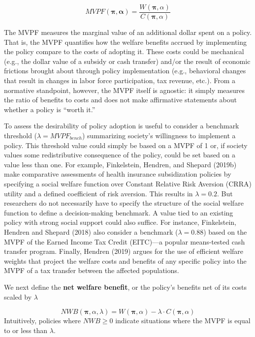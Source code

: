 \documentclass[
  10pt,
]{article}
\begin{document}
\[
MVPF(\boldsymbol{\boldsymbol{\pi},\alpha}) = \frac{W(\boldsymbol{\pi},\alpha)}{C(\boldsymbol{\pi},\alpha)}
\]

The MVPF measures the marginal value of an additional dollar spent on a
policy. That is, the MVPF quantifies how the welfare benefits accrued by
implementing the policy compare to the costs of adopting it. These costs
could be mechanical (e.g., the dollar value of a subsidy or cash
transfer) and/or the result of economic frictions brought about through
policy implementation (e.g., behavioral changes that result in changes
in labor force participation, tax revenue, etc.). From a normative
standpoint, however, the MVPF itself is agnostic: it simply measures the
ratio of benefits to costs and does not make affirmative statements
about whether a policy is ``worth it.''

To assess the desirability of policy adoption is useful to consider a
benchmark threshold (\(\lambda = MVPF_{bench}\)) summarizing society's
willingness to implement a policy. This threshold value could simply be
based on a MVPF of 1 or, if society values some redistributive
consequence of the policy, could be set based on a value less than one.
For example, Finkelstein, Hendren, and Shepard (2019b) make comparative
assessments of health insurance subsidization policies by specifying a
social welfare function over Constant Relative Risk Aversion (CRRA)
utility and a defined coefficient of risk aversion. This results in
\(\lambda = 0.2\). But researchers do not necessarily have to specify
the structure of the social welfare function to define a decision-making
benchmark. A value tied to an existing policy with strong social support
could also suffice. For instance, Finkelstein, Hendren and Shepard
(2018) also consider a benchmark (\(\lambda = 0.88\)) based on the MVPF
of the Earned Income Tax Credit (EITC)---a popular means-tested cash
transfer program. Finally, Hendren (2019) argues for the use of
efficient welfare weights that project the welfare costs and benefits of
any specific policy into the MVPF of a tax transfer between the affected
populations.

We next define the \textbf{net welfare benefit}, or the policy's
benefits net of its costs scaled by \(\lambda\)

\[
NWB(\boldsymbol{\pi},\alpha,\lambda) = W(\boldsymbol{\pi},\alpha) - \lambda \cdot C(\boldsymbol{\pi},\alpha) 
\] Intuitively, policies where \(NWB \geq 0\) indicate situations where
the MVPF is equal to or less than \(\lambda\).
\end{document}

